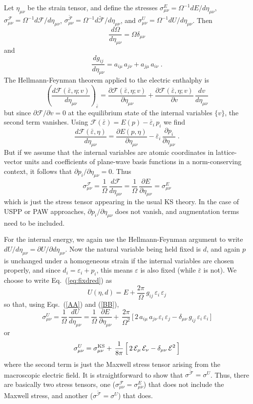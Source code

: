 \documentclass[11pt,fleqn]{article}
\def\beq{\begin{equation}}
\def\eeq{\end{equation}}
\def\E{\mathcal{E}}
\def\ee{{\varepsilon}}
\def\eb{\bar{\ee}}
\def\emn{\eta_{\mu\nu}}
\def\O{\Omega}
\def\too{\frac{2\pi}{\O}}
\def\F{\mathcal{F}}
\def\Ft{{\widetilde{\F}}}
\def\gg{g_{ij}}
\begin{document}
Let $\emn$ be the strain tensor, and define the stresses
$\sigma_{\mu\nu}^E=\Omega^{-1}dE/d\emn$,
$\sigma_{\mu\nu}^\F=\Omega^{-1}d\F/d\emn$,
$\sigma_{\mu\nu}^{\Ft}=\Omega^{-1}d\Ft/d\emn$, and
$\sigma_{\mu\nu}^U=\Omega^{-1}dU/d\emn$.
Then
%
\beq
\frac{d\O}{d\emn}=\O\delta_{\mu\nu}
\label{AA}
\eeq
%
and
%
\beq
\frac{d\gg}{d\emn} = a_{i\mu}\,a_{j\nu} + a_{j\mu}\,a_{i\nu}  \;.
\label{BB}
\eeq
%
The Hellmann-Feynman theorem applied to the electric enthalphy is
%
\beq
\left(\frac{d\F(\eb,\eta;v)}{d\emn}\right)_{\eb}=
\frac{\partial \F(\eb,\eta;v)}{\partial\emn} +
 \frac{\partial \F(\eb,\eta;v)}{\partial v}\,\frac{dv}{d\emn}
\eeq
%
but since $\partial \F/\partial v=0$ at the equilibrium state of the internal
variables $\{v\}$, the second term vanishes.  Using
$\F(\eb) =E(p)-\eb_i\,p_i$ we find
%
\beq
\frac{d\F(\eb,\eta)}{d\emn}=\frac{\partial E(p,\eta)}{\partial\emn}
-\eb_i\,\frac{\partial p_i}{\partial\emn} \;.
\eeq
%
But if we assume that the internal variables are atomic
coordinates in lattice-vector units and coefficients of plane-wave
basis functions in a norm-conserving context, it follows that
$\partial p_i/\partial\emn=0$.  Thus
%
\beq
\sigma^\F_{\mu\nu}=
\frac{1}{\O}\,\frac{d\F}{d\emn}=
\frac{1}{\O}\,\frac{\partial E}{\partial\emn} = \sigma^E_{\mu\nu}
\eeq
%
which is just the stress tensor appearing in the usual KS theory.
In the case of USPP or PAW approaches, $\partial p_i/\partial\emn$
does not vanish, and augmentation terms need to be included.

For the internal energy, we again use the Hellmann-Feynman argument
to write $dU/d\emn=\partial U/\partial d\emn$.  Now the natural
variable being held fixed is $d$, and again $p$ is unchanged under
a homogeneous strain if the internal variables are chosen properly,
and since $d_i=\ee_i+p_i$, this means $\ee$ is also fixed (while
$\eb$ is not).  We choose to write Eq.~(\ref{eq:fixdred}) as
%
\beq
U(\eta,d)=E+\too\,\gg\,\ee_i\,\ee_j
\eeq
%
so that, using Eqs.~(\ref{AA}) and (\ref{BB}),
%
\beq
\sigma^U_{\mu\nu}=
\frac{1}{\O}\,\frac{dU}{d\emn}
= \frac{1}{\O}\,\frac{\partial E}{\partial\emn}
+\,\frac{2\pi}{\O^2}\,
\Big[\,
2\,a_{i\mu}\,a_{j\nu}\,\ee_i\,\ee_j -\delta_{\mu\nu}\,\gg\,\ee_i\,\ee_i
\,\Big]
\eeq
%
or
%
\beq
\sigma^U_{\mu\nu}=\sigma^{\rm KS}_{\mu\nu}+\,\frac{1}{8\pi}\,
\Big[\, 2\,\E_\mu\,\E_\nu - \delta_{\mu\nu}\,\E^2 \,\Big]
\eeq
%
where the second term is just the Maxwell stress tensor arising from the
macroscopic electric field.  It is straightforward to show that
$\sigma^{\Ft}=\sigma^U$.  Thus, there are basically two stress
tensors, one ($\sigma^\F_{\mu\nu}=\sigma^E_{\mu\nu}$) that does not include
the Maxwell stress, and another ($\sigma^{\Ft}=\sigma^U$) that does.
\end{document}
